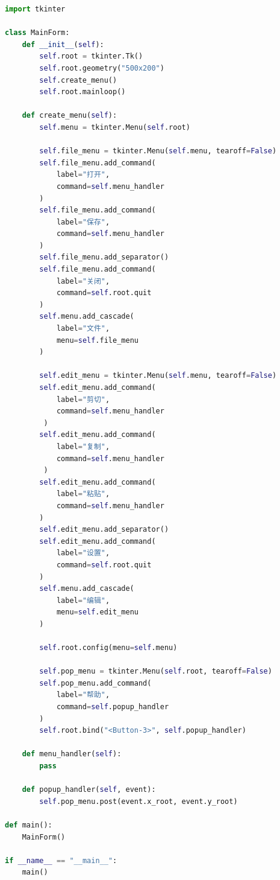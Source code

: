 \begin{lstlisting}[language=Python]
import tkinter

class MainForm:
    def __init__(self):
        self.root = tkinter.Tk()
        self.root.geometry("500x200")
        self.create_menu()
        self.root.mainloop()
    
    def create_menu(self):
        self.menu = tkinter.Menu(self.root)

        self.file_menu = tkinter.Menu(self.menu, tearoff=False)
        self.file_menu.add_command(
            label="打开", 
            command=self.menu_handler
        )
        self.file_menu.add_command(
            label="保存", 
            command=self.menu_handler
        )
        self.file_menu.add_separator()
        self.file_menu.add_command(
            label="关闭", 
            command=self.root.quit
        )
        self.menu.add_cascade(
            label="文件", 
            menu=self.file_menu
        )

        self.edit_menu = tkinter.Menu(self.menu, tearoff=False)
        self.edit_menu.add_command(
            label="剪切", 
            command=self.menu_handler
         )
        self.edit_menu.add_command(
            label="复制", 
            command=self.menu_handler
         )
        self.edit_menu.add_command(
            label="粘贴", 
            command=self.menu_handler
        )
        self.edit_menu.add_separator()
        self.edit_menu.add_command(
            label="设置", 
            command=self.root.quit
        )
        self.menu.add_cascade(
            label="编辑", 
            menu=self.edit_menu
        )

        self.root.config(menu=self.menu)

        self.pop_menu = tkinter.Menu(self.root, tearoff=False)
        self.pop_menu.add_command(
            label="帮助", 
            command=self.popup_handler
        )
        self.root.bind("<Button-3>", self.popup_handler)
    
    def menu_handler(self):
        pass

    def popup_handler(self, event):
        self.pop_menu.post(event.x_root, event.y_root)

def main():
    MainForm()

if __name__ == "__main__":
    main()
\end{lstlisting}

